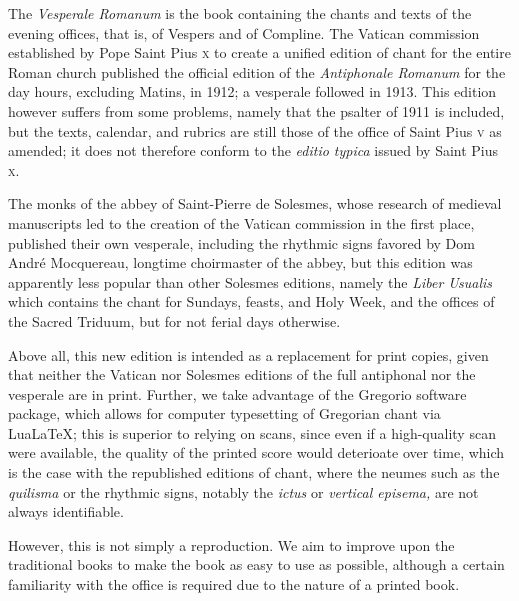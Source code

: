 

\begin{enpars}
The \textit{Vesperale Romanum} is the book containing the chants and texts of the evening offices, that is, of Vespers and of Compline. The Vatican commission established by Pope Saint Pius \textsc{x} to create a unified edition of chant for the entire Roman church published the official edition of the \textit{Antiphonale Romanum} for the day hours, excluding Matins, in 1912; a vesperale followed in 1913. This edition however suffers from some problems, namely that the psalter of 1911 is included, but the texts, calendar, and rubrics are still those of the office of Saint Pius \textsc{v} as amended; it does not therefore conform to the \textit{editio typica} issued by Saint Pius \textsc{x}.

The monks of the abbey of Saint-Pierre de Solesmes, whose research of medieval manuscripts led to the creation of the Vatican commission in the first place, published their own vesperale, including the rhythmic signs favored by Dom André Mocquereau, longtime choirmaster of the abbey, but this edition was apparently less popular than other Solesmes editions, namely the \textit{Liber Usualis} which contains the chant for Sundays, feasts, and Holy Week, and the offices of the Sacred Triduum, but for not ferial days otherwise.


Above all, this new edition is intended as a replacement for print copies, given that neither the Vatican nor Solesmes editions of the full antiphonal nor the vesperale are in print. Further, we take advantage of the Gregorio software package, which allows for computer typesetting of Gregorian chant via LuaLaTeX; this is superior to relying on scans, since even if a high-quality scan were available, the quality of the printed score would deterioate over time, which is the case with the republished editions of chant, where the neumes such as the \textit{quilisma} or the rhythmic signs, notably the \textit{ictus} or \textit{vertical episema,} are not always identifiable.

However, this is not simply a reproduction. We aim to improve upon the traditional books to make the book as easy to use as possible, although a certain familiarity with the office is required due to the nature of a printed book.



\end{enpars}
